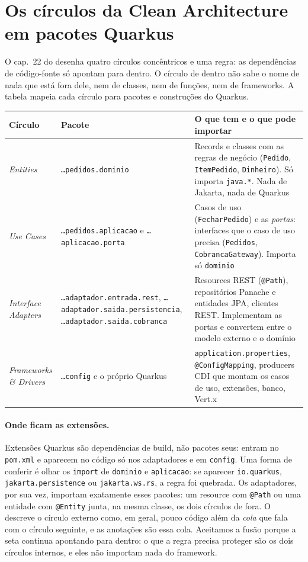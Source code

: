 \section{Os círculos da Clean Architecture em pacotes Quarkus}
\label{sec:circulos-quarkus}

O cap.~22 do  desenha quatro círculos
concêntricos e uma regra: as dependências de código-fonte só apontam
para dentro. O círculo de dentro não sabe o nome de nada que está fora
dele, nem de classes, nem de funções, nem de frameworks. A tabela mapeia
cada círculo para pacotes e construções do Quarkus.

\small
\begin{longtable}{@{}p{2.4cm} p{4.4cm} p{5.4cm}@{}}
\toprule
Círculo & Pacote & O que tem e o que pode importar \\
\midrule \endhead
\emph{Entities} & \texttt{\ldots pedidos.dominio} & Records e classes
  com as regras de negócio (\texttt{Pedido}, \texttt{ItemPedido},
  \texttt{Dinheiro}). Só importa \texttt{java.*}. Nada de Jakarta, nada
  de Quarkus \\
\emph{Use Cases} & \texttt{\ldots pedidos.aplicacao} e
  \texttt{\ldots aplicacao.porta} & Casos de uso (\texttt{FecharPedido})
  e as \emph{portas}: interfaces que o caso de uso precisa
  (\texttt{Pedidos}, \texttt{CobrancaGateway}). Importa só
  \texttt{dominio} \\
\emph{Interface Adapters} & \texttt{\ldots adaptador.\allowbreak entrada.\allowbreak rest},
  \texttt{\ldots adaptador.\allowbreak saida.\allowbreak persistencia},
  \texttt{\ldots adaptador.\allowbreak saida.\allowbreak cobranca} & Resources REST (\texttt{@Path}),
  repositórios Panache e entidades JPA, clientes REST. Implementam as
  portas e convertem entre o modelo externo e o domínio \\
\emph{Frameworks \& Drivers} & \texttt{\ldots config} e o próprio
  Quarkus & \texttt{application.properties}, \texttt{@ConfigMapping},
  producers CDI que montam os casos de uso, extensões, banco, Vert.x \\
\bottomrule
\end{longtable}
\normalsize

\paragraph{Onde ficam as extensões.}
Extensões Quarkus são dependências de build, não pacotes seus: entram no
\texttt{pom.xml} e aparecem no código só nos adaptadores e em
\texttt{config}. Uma forma de conferir é olhar os \texttt{import} de
\texttt{dominio} e \texttt{aplicacao}: se aparecer \texttt{io.quarkus},
\texttt{jakarta.persistence} ou \texttt{jakarta.ws.rs}, a regra foi
quebrada. Os adaptadores, por sua vez, importam exatamente esses
pacotes: um resource com \texttt{@Path} ou uma entidade com
\texttt{@Entity} junta, na mesma classe, os dois círculos de fora. O
 descreve o círculo externo como, em geral,
pouco código além da \emph{cola} que fala com o círculo seguinte, e as
anotações são essa cola. Aceitamos a fusão porque a seta continua
apontando para dentro: o que a regra precisa proteger são os dois
círculos internos, e eles não importam nada do framework.

